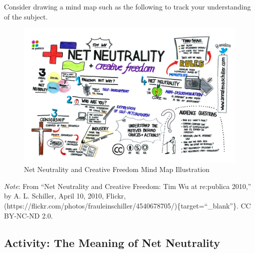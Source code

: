 \documentclass[
  letterpaper,
  DIV=11,
  numbers=noendperiod]{scrreprt}
\begin{document}
Consider drawing a mind map such as the following to track your
understanding of the subject.

\begin{figure}

\caption{\label{fig-4540678705xff7936561a}Net Neutrality and Creative
Freedom Mind Map Illustration}

\includegraphics{assets/u6/net_neutrality_creative_freedom.jpg}

\end{figure}%

\begin{tcolorbox}[enhanced jigsaw, toprule=.15mm, colback=white, colframe=quarto-callout-note-color-frame, arc=.35mm, opacityback=0, breakable, rightrule=.15mm, bottomrule=.15mm, leftrule=.75mm, left=2mm]

\emph{Note}: From ``Net Neutrality and Creative Freedom: Tim Wu at
re:publica 2010,'' by A. L. Schiller, April 10, 2010, Flickr,
(https://flickr.com/photos/frauleinschiller/4540678705/)\{target=``\_blank''\}.
CC BY-NC-ND 2.0.

\end{tcolorbox}

\subsection{Activity: The Meaning of Net
Neutrality}\label{activity-the-meaning-of-net-neutrality}
\end{document}
